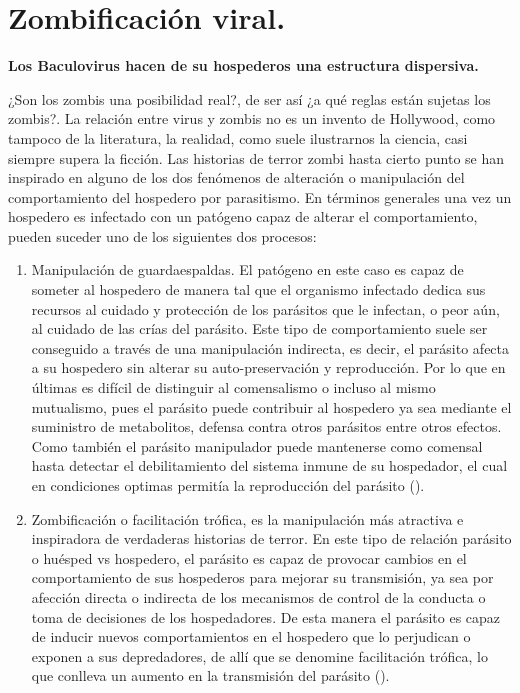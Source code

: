 \documentclass[
  12pt, krantz2,
  spanish,
]{krantz}
\begin{document}
\hypertarget{zombi}{%
\section{Zombificación viral.}\label{zombi}}

\textbf{Los Baculovirus hacen de su hospederos una estructura dispersiva.}

¿Son los zombis una posibilidad real?, de ser así ¿a qué reglas están sujetas los zombis?. La relación entre virus y zombis no es un invento de Hollywood, como tampoco de la literatura, la realidad, como suele ilustrarnos la ciencia, casi siempre supera la ficción. Las historias de terror zombi hasta cierto punto se han inspirado en alguno de los dos fenómenos de alteración o manipulación del comportamiento del hospedero por parasitismo. En términos generales una vez un hospedero es infectado con un patógeno capaz de alterar el comportamiento, pueden suceder uno de los siguientes dos procesos:

\begin{enumerate}
\def\labelenumi{\arabic{enumi}.}
\item
  Manipulación de guardaespaldas. El patógeno en este caso es capaz de someter al hospedero de manera tal que el organismo infectado dedica sus recursos al cuidado y protección de los parásitos que le infectan, o peor aún, al cuidado de las crías del parásito. Este tipo de comportamiento suele ser conseguido a través de una manipulación indirecta, es decir, el parásito afecta a su hospedero sin alterar su auto-preservación y reproducción. Por lo que en últimas es difícil de distinguir al comensalismo o incluso al mismo mutualismo, pues el parásito puede contribuir al hospedero ya sea mediante el suministro de metabolitos, defensa contra otros parásitos entre otros efectos. Como también el parásito manipulador puede mantenerse como comensal hasta detectar el debilitamiento del sistema inmune de su hospedador, el cual en condiciones optimas permitía la reproducción del parásito (\citet{seppala2008host}).
\item
  Zombificación o facilitación trófica, es la manipulación más atractiva e inspiradora de verdaderas historias de terror. En este tipo de relación parásito o huésped vs hospedero, el parásito es capaz de provocar cambios en el comportamiento de sus hospederos para mejorar su transmisión, ya sea por afección directa o indirecta de los mecanismos de control de la conducta o toma de decisiones de los hospedadores. De esta manera el parásito es capaz de inducir nuevos comportamientos en el hospedero que lo perjudican o exponen a sus depredadores, de allí que se denomine facilitación trófica, lo que conlleva un aumento en la transmisión del parásito (\citet{seppala2008host}).
\end{enumerate}
\end{document}
